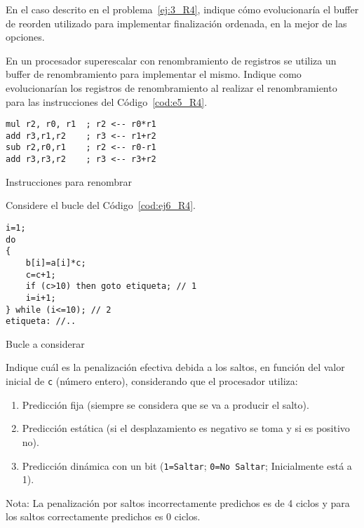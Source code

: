 \begin{ejercicio}
    En el caso descrito en el problema~\ref{ej:3_R4}, indique cómo evolucionaría el buffer de reorden utilizado para implementar finalización ordenada, en la mejor de las opciones. 
\end{ejercicio}

\begin{ejercicio}
    En un procesador superescalar con renombramiento de registros se utiliza un buffer de renombramiento para implementar el mismo. Indique como evolucionarían los registros de renombramiento al realizar el renombramiento para las instrucciones del Código~\ref{cod:e5_R4}.
   \begin{listing}[H]
   \begin{verbatim}
mul r2, r0, r1  ; r2 <-- r0*r1
add r3,r1,r2    ; r3 <-- r1+r2
sub r2,r0,r1    ; r2 <-- r0-r1
add r3,r3,r2    ; r3 <-- r3+r2
   \end{verbatim}
   \caption{Instrucciones para renombrar}
   \label{cod:e5_R4}
   \end{listing}
\end{ejercicio}

\begin{ejercicio}\label{ej:6_R4}
    Considere el bucle del Código~\ref{cod:ej6_R4}.
    \begin{listing}[H]
    \begin{verbatim}
i=1;
do
{
    b[i]=a[i]*c;
    c=c+1;
    if (c>10) then goto etiqueta; // 1
    i=i+1;
} while (i<=10); // 2
etiqueta: //..
    \end{verbatim}
    \caption{Bucle a considerar}
    \label{cod:ej6_R4}
    \end{listing}

Indique cuál es la penalización efectiva debida a los saltos, en función del valor inicial de \verb|c| (número entero), considerando que el procesador utiliza:
\begin{enumerate}
    \item Predicción fija (siempre se considera que se va a producir el salto).
    \item Predicción estática (si el desplazamiento es negativo se toma y si es positivo no).
    \item Predicción dinámica con un bit (\verb|1=Saltar|; \verb|0=No Saltar|; Inicialmente está a 1).
\end{enumerate}
Nota: La penalización por saltos incorrectamente predichos es de 4 ciclos y para los saltos correctamente predichos es 0 ciclos.
\end{ejercicio}

